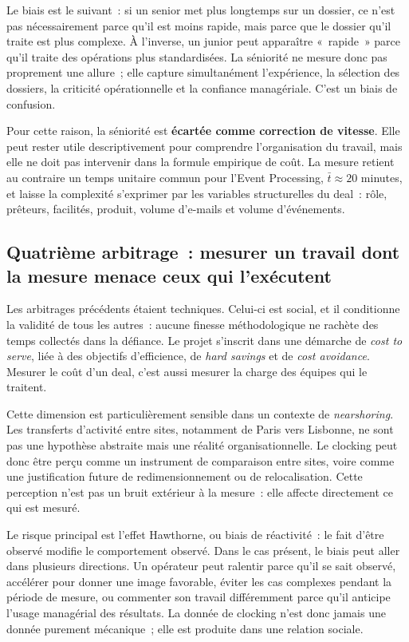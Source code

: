 Le biais est le suivant~: si un senior met plus longtemps sur un dossier, ce n'est pas nécessairement parce qu'il est moins rapide, mais parce que le dossier qu'il traite est plus complexe. À l'inverse, un junior peut apparaître «~rapide~» parce qu'il traite des opérations plus standardisées. La séniorité ne mesure donc pas proprement une allure~; elle capture simultanément l'expérience, la sélection des dossiers, la criticité opérationnelle et la confiance managériale. C'est un biais de confusion.

Pour cette raison, la séniorité est \textbf{écartée comme correction de vitesse}. Elle peut rester utile descriptivement pour comprendre l'organisation du travail, mais elle ne doit pas intervenir dans la formule empirique de coût. La mesure retient au contraire un temps unitaire commun pour l'Event Processing, $\bar{t}\approx20$ minutes, et laisse la complexité s'exprimer par les variables structurelles du deal~: rôle, prêteurs, facilités, produit, volume d'e-mails et volume d'événements.

\subsection{Quatrième arbitrage~: mesurer un travail dont la mesure menace ceux qui l'exécutent}
\label{sec:arbitrage-social}

Les arbitrages précédents étaient techniques. Celui-ci est social, et il conditionne la validité de tous les autres~: aucune finesse méthodologique ne rachète des temps collectés dans la défiance. Le projet s'inscrit dans une démarche de \textit{cost to serve}, liée à des objectifs d'efficience, de \textit{hard savings} et de \textit{cost avoidance}. Mesurer le coût d'un deal, c'est aussi mesurer la charge des équipes qui le traitent.

Cette dimension est particulièrement sensible dans un contexte de \textit{nearshoring}. Les transferts d'activité entre sites, notamment de Paris vers Lisbonne, ne sont pas une hypothèse abstraite mais une réalité organisationnelle. Le clocking peut donc être perçu comme un instrument de comparaison entre sites, voire comme une justification future de redimensionnement ou de relocalisation. Cette perception n'est pas un bruit extérieur à la mesure~: elle affecte directement ce qui est mesuré.

Le risque principal est l'effet Hawthorne, ou biais de réactivité~: le fait d'être observé modifie le comportement observé. Dans le cas présent, le biais peut aller dans plusieurs directions. Un opérateur peut ralentir parce qu'il se sait observé, accélérer pour donner une image favorable, éviter les cas complexes pendant la période de mesure, ou commenter son travail différemment parce qu'il anticipe l'usage managérial des résultats. La donnée de clocking n'est donc jamais une donnée purement mécanique~; elle est produite dans une relation sociale.

